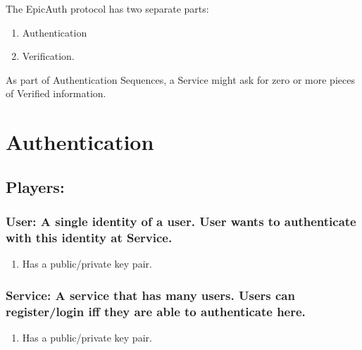 \documentclass[11pt]{article}
\author{W-M}
\date{\today}
\title{}
\begin{document}
\tableofcontents

The EpicAuth protocol has two separate parts:

\begin{enumerate}
\item Authentication
\item Verification.
\end{enumerate}

As part of Authentication Sequences, a Service might ask for zero or more pieces of Verified information.


\section{Authentication}
\label{sec:org90569ec}
\subsection{Players:}
\label{sec:org46cc5b0}
\subsubsection{User: A single identity of a user. User wants to authenticate with this identity at Service.}
\label{sec:org5c1de7c}
\begin{enumerate}
\item Has a public/private key pair.
\label{sec:org97272a2}
\end{enumerate}
\subsubsection{Service: A service that has many users. Users can register/login iff they are able to authenticate here.}
\label{sec:orgf32b99c}
\begin{enumerate}
\item Has a public/private key pair.
\label{sec:org53f5032}
\end{enumerate}
\end{document}
